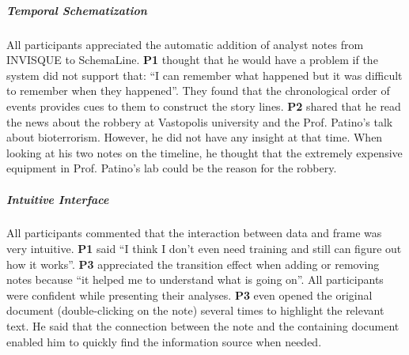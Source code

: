 \subparagraph{Temporal Schematization}
All participants appreciated the automatic addition of analyst notes from INVISQUE to SchemaLine. \textbf{P1} thought that he would have a problem if the system did not support that: ``I can remember what happened but it was difficult to remember when they happened''. They found that the chronological order of events provides cues to them to construct the story lines. \textbf{P2} shared that he read the news about the robbery at Vastopolis university and the Prof. Patino's talk about bioterrorism. However, he did not have any insight at that time. When looking at his two notes on the timeline, he thought that the extremely expensive equipment in Prof. Patino's lab could be the reason for the robbery.

\subparagraph{Intuitive Interface}
All participants commented that the interaction between data and frame was very intuitive. \textbf{P1} said ``I think I don't even need training and still can figure out how it works''. \textbf{P3} appreciated the transition effect when adding or removing notes because ``it helped me to understand what is going on''. All participants were confident while presenting their analyses. \textbf{P3} even opened the original document (double-clicking on the note) several times to highlight the relevant text. He said that the connection between the note and the containing document enabled him to quickly find the information source when needed.